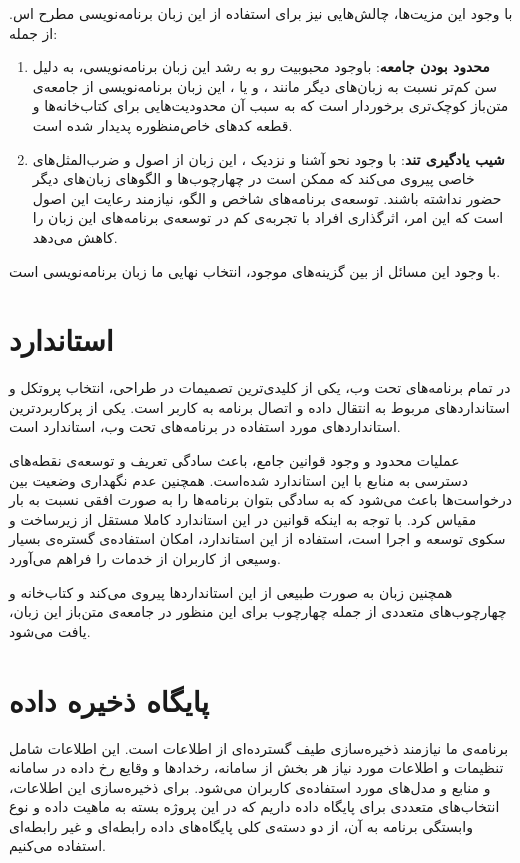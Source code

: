 با وجود این مزیت‌ها، چالش‌هایی نیز برای استفاده از این زبان برنامه‌نویسی مطرح اس\cite{Lockard2019}. از جمله:
\begin{enumerate}
\item \textbf{محدود بودن جامعه}: باوجود محبوبیت رو به رشد این زبان برنامه‌نویسی، به دلیل سن کم‌تر نسبت به زبان‌های دیگر مانند ،  و یا ، این زبان برنامه‌نویسی از جامعه‌ی متن‌باز کوچک‌تری برخوردار است که به سبب آن محدودیت‌هایی برای کتاب‌خانه‌ها و قطعه کد‌های خاص‌منظوره پدیدار شده است.

\item \textbf{شیب یادگیری تند}: با وجود نحو آشنا و نزدیک ، این زبان از اصول و ضرب‌المثل‌های خاصی پیروی می‌کند که ممکن است در چهارچوب‌ها و الگوهای زبان‌های دیگر حضور نداشته باشند. توسعه‌ی برنامه‌های شاخص و الگو، نیازمند رعایت این اصول است که این امر، اثرگذاری افراد با تجربه‌ی کم در توسعه‌ی برنامه‌های این زبان را کاهش می‌دهد.
\end{enumerate}

با وجود این مسائل از بین گزینه‌های موجود، انتخاب نهایی ما زبان برنامه‌نویسی  است.

\section{استاندارد }
در تمام برنامه‌های تحت وب، یکی از کلیدی‌ترین تصمیمات در طراحی، انتخاب پروتکل و استاندارد‌های مربوط به انتقال داده و اتصال برنامه‌ به کاربر است. یکی از پرکاربردترین استانداردهای مورد استفاده در برنامه‌های تحت وب، استاندارد  است.

عملیات محدود و وجود قوانین جامع، باعث سادگی تعریف و توسعه‌ی نقطه‌های دسترسی به منابع با این استاندارد شده‌است. همچنین عدم نگهداری وضعیت بین درخواست‌ها باعث می‌شود که به سادگی بتوان برنامه‌ها را به صورت افقی نسبت به بار مقیاس کرد. با توجه به اینکه قوانین در این استاندارد کاملا مستقل از زیرساخت و سکوی توسعه و اجرا است، استفاده از این استاندارد، امکان استفاده‌ی گستره‌ی بسیار وسیعی از کاربران از خدمات را فراهم می‌آورد.\cite{Fielding:2000}

همچنین زبان  به صورت طبیعی از این استانداردها پیروی می‌کند و کتاب‌خانه و چهارچوب‌های متعددی از جمله چهارچوب  برای این منظور در جامعه‌ی متن‌باز این زبان، یافت می‌شود.

\section{پایگاه ذخیره داده}
برنامه‌ی ما نیازمند ذخیره‌سازی طیف گسترده‌ای از اطلاعات است. این اطلاعات شامل تنظیمات و اطلاعات مورد نیاز هر بخش از سامانه، رخداد‌ها و وقایع رخ داده در سامانه و منابع و مدل‌های مورد استفاده‌ی کاربران می‌شود. برای ذخیره‌سازی این اطلاعات، انتخاب‌های متعددی برای پایگاه داده داریم که در این پروژه بسته به ماهیت داده و نوع وابستگی برنامه به آن، از دو دسته‌ی کلی پایگاه‌های داده رابطه‌ای و غیر رابطه‌ای استفاده می‌کنیم.

